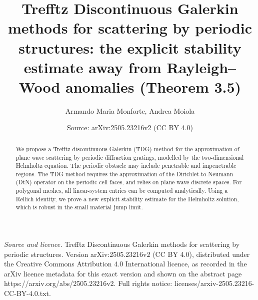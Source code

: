 \documentclass[10pt,a4paper]{amsart}
\title[Explicit stability estimate for the periodic Helmholtz problem (Theorem 3.5)]{Trefftz Discontinuous Galerkin methods for scattering by periodic structures: the explicit stability estimate away from Rayleigh--Wood anomalies (Theorem 3.5)}
\author{Armando Maria Monforte, Andrea Moiola}
\date{Source: arXiv:2505.23216v2 (CC BY 4.0)}
\begin{document}
\begin{abstract}
	We propose a Trefftz discontinuous Galerkin (TDG) method for the approximation of plane wave scattering by periodic diffraction gratings, modelled by the two-dimensional Helmholtz equation.
	The periodic obstacle may include penetrable and impenetrable regions.
	The TDG method requires the approximation of the Dirichlet-to-Neumann (DtN) operator on the periodic cell faces, and relies on plane wave discrete spaces.
	For polygonal meshes, all linear-system entries can be computed analytically.
	Using a Rellich identity, we prove a new explicit stability estimate for the Helmholtz solution, which is robust in the small material jump limit.


\end{abstract}
\maketitle

\noindent\emph{Source and licence.} Trefftz Discontinuous Galerkin methods for scattering by periodic structures. Version arXiv:2505.23216v2 (CC BY 4.0), distributed under the Creative Commons Attribution 4.0 International licence, as recorded in the arXiv licence metadata for this exact version and shown on the abstract page https://arxiv.org/abs/2505.23216v2. Full rights notice: licenses/arxiv-2505.23216-CC-BY-4.0.txt.\par\smallskip
\end{document}
